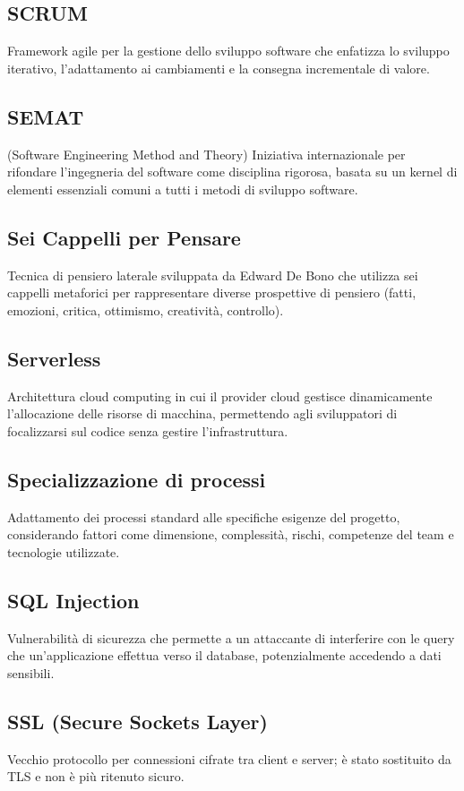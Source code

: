 \documentclass[a4paper,11pt]{article}
\begin{document}
\subsection{SCRUM}
Framework agile per la gestione dello sviluppo software che enfatizza lo sviluppo iterativo, l'adattamento ai cambiamenti e la consegna incrementale di valore.

\subsection{SEMAT}
(Software Engineering Method and Theory) Iniziativa internazionale per rifondare l'ingegneria del software come disciplina rigorosa, basata su un kernel di elementi essenziali comuni a tutti i metodi di sviluppo software.

\subsection{Sei Cappelli per Pensare}
Tecnica di pensiero laterale sviluppata da Edward De Bono che utilizza sei cappelli metaforici per rappresentare diverse prospettive di pensiero (fatti, emozioni, critica, ottimismo, creatività, controllo).

\subsection{Serverless}
Architettura cloud computing in cui il provider cloud gestisce dinamicamente l'allocazione delle risorse di macchina, permettendo agli sviluppatori di focalizzarsi sul codice senza gestire l'infrastruttura.

\subsection{Specializzazione di processi}
Adattamento dei processi standard alle specifiche esigenze del progetto, considerando fattori come dimensione, complessità, rischi, competenze del team e tecnologie utilizzate.

\subsection{SQL Injection}
Vulnerabilità di sicurezza che permette a un attaccante di interferire con le query che un'applicazione effettua verso il database, potenzialmente accedendo a dati sensibili.

\subsection{SSL (Secure Sockets Layer)}
Vecchio protocollo per connessioni cifrate tra client e server; è stato sostituito da TLS e non è più ritenuto sicuro.
\end{document}
